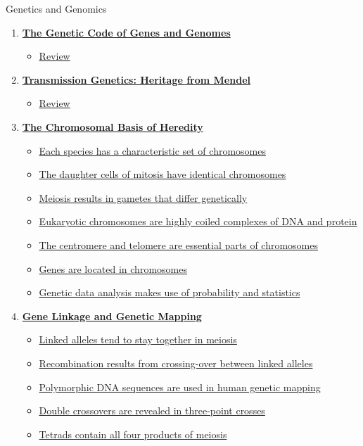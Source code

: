 \documentclass[12pt,letterpaper]{article}
\begin{document}
\begin{chapbox}{Genetics and Genomics}{ 
\begin{enumerate}[font=\bfseries, wide]
\item \hyperlink{1}{\textbf{The Genetic Code of Genes and Genomes}}
    \begin{itemize}
        \item \hyperlink{1.r}{Review}
    \end{itemize}
    \item \hyperlink{2}{\textbf{Transmission Genetics: Heritage from Mendel}}
    \begin{itemize}
        \item \hyperlink{2.r}{Review}
    \end{itemize}
    \item \hyperlink{3}{\textbf{The Chromosomal Basis of Heredity}}
    \begin{itemize}
        \item \hyperlink{3.1}{Each species has a characteristic set of chromosomes}
        \item \hyperlink{3.2}{The daughter cells of mitosis have identical chromosomes}
        \item \hyperlink{3.3}{Meiosis results in gametes that differ genetically}
        \item \hyperlink{3.4}{Eukaryotic chromosomes are highly coiled complexes of DNA and protein}
        \item \hyperlink{3.5}{The centromere and telomere are essential parts of chromosomes}
        \item \hyperlink{3.6}{Genes are located in chromosomes}
        \item \hyperlink{3.7}{Genetic data analysis makes use of probability and statistics}
    \end{itemize}
    \item \hyperlink{4}{\textbf{Gene Linkage and Genetic Mapping}}
    \begin{itemize}
        \item \hyperlink{4.1}{Linked alleles tend to stay together in meiosis}
        \item \hyperlink{4.2}{Recombination results from crossing-over between linked alleles}
        \item \hyperlink{4.3}{Polymorphic DNA sequences are used in human genetic mapping}
        \item \hyperlink{4.4}{Double crossovers are revealed in three-point crosses}
        \item \hyperlink{4.5}{Tetrads contain all four products of meiosis}

\end{itemize}
\end{enumerate}}
\end{chapbox}
\end{document}
